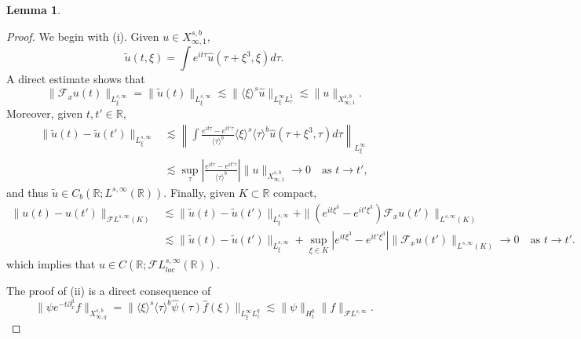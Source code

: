 \documentclass[%
11pt,  reqno]{amsart}
\newcommand{\jap}[1]{\langle #1 \rangle}
\newcommand{\5}{\textup{V}}
\newcommand{\noi}{\noindent}
\newtheorem{lemma}[theorem]{Lemma}
\theoremstyle{remark}
\newcommand{\R}{\mathbb{R}}
\numberwithin{equation}{section}
\numberwithin{theorem}{section}
\begin{document}
{\begin{lemma}
			
			
		\end{lemma}
		
		\begin{proof}
			
			We begin with (i). Given $u\in X^{s,b}_{\infty,1}$,
			$$
			\tilde{u}(t,\xi)=\int e^{it\tau}\hat{u}(\tau+\xi^3,\xi)d\tau.
			$$
			A direct estimate shows that
			$$
			\|\mathcal{F}_xu(t)\|_{L^{s,\infty}_\xi} = \|\tilde{u}(t)\|_{L^{s,\infty}_\xi} \lesssim \|\jap{\xi}^s\hat{u}\|_{L^\infty_\xi L^1_\tau} \lesssim \|u\|_{X^{s,b}_{\infty,1}}.
			$$
			Moreover, given $t,t'\in\R$,
			\begin{align*}
				\|\tilde{u}(t)-\tilde{u}(t')\|_{L_\xi^{s,\infty}} &\lesssim \left\|\int \frac{e^{it\tau}-e^{it'\tau}}{\jap{\tau}^b}\jap{\xi}^s\jap{\tau}^b\hat{u}(\tau+\xi^3,\tau)d\tau\right\|_{L^\infty_\xi}\\&\lesssim \sup_{\tau} \left| \frac{e^{it\tau}-e^{it'\tau}}{\jap{\tau}^b}\right| \|u\|_{X^{s,b}_{\infty,1}} \to 0 \quad \mbox{as }t\to t',
			\end{align*}
			and thus $\tilde{u}\in C_b(\R;L^{s,\infty}(\R))$. Finally, given $K\subset \R$ compact,
			\begin{align*}
				\|u(t)-u(t')\|_{\mathcal{F}L^{s,\infty}(K)} &\lesssim \|\tilde{u}(t)-\tilde{u}(t')\|_{L^{s,\infty}_\xi} + \|(e^{it\xi^3}-e^{it'\xi^3})\mathcal{F}_xu(t')\|_{L^{s,\infty}(K)} \\&\lesssim \|\tilde{u}(t)-\tilde{u}(t')\|_{L^{s,\infty}_\xi} + \sup_{\xi\in K}\left|e^{it\xi^3}-e^{it'\xi^3}\right|\|\mathcal{F}_xu(t')\|_{L^{s,\infty}(K)} \to 0\quad \mbox{as }t\to t'.
			\end{align*}
			which implies that $u\in C(\R;\mathcal{F}L^{s,\infty}_{loc}(\R))$.
			
			\textbf{}
			
			\noi The proof of (ii) is a direct consequence of
			$$
			\|\psi e^{-t\partial_x^3}f\|_{X^{s,b}_{\infty,q}} = \|\jap{\xi}^s\jap{\tau}^b\hat{\psi}(\tau)\hat{f}(\xi)\|_{L^\infty_\xi L^q_\tau} \lesssim \|\psi\|_{H^b_t} \|f\|_{\mathcal{F}L^{s,\infty}}.
			$$
			

\end{proof}}
\end{document}
